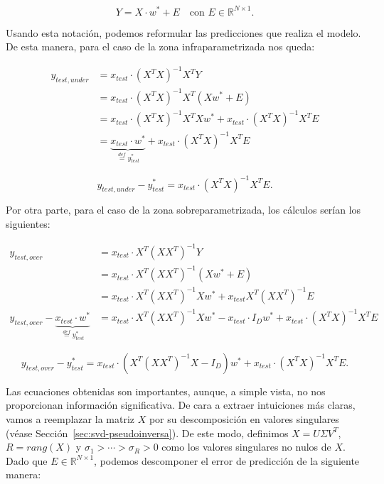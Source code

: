 \[
    Y = X \cdot w^{*} + E \quad \text{con } E \in \mathbb{R}^{N \times 1}.
\]\newline

Usando esta notación, podemos reformular las predicciones que realiza el modelo. De esta manera, para el caso de la zona infraparametrizada nos queda:

\begin{align}
    y_{test, under} &= x_{test} \cdot {(X^T X)}^{-1} X^T Y \\
    &= x_{test} \cdot {(X^T X)}^{-1} X^T (X w^{*} + E) \\
    &= x_{test} \cdot {(X^T X)}^{-1} X^T X w^{*} + x_{test} \cdot {(X^T X)}^{-1} X^T E \\
    &= \underbrace{x_{test} \cdot w^{*}}_{\overset{def}{=} y^*_{test}} + x_{test} \cdot {(X^T X)}^{-1} X^T E
\end{align}

\begin{equation}
    y_{test, under} - y^{*}_{test} = x_{test} \cdot {(X^T X)}^{-1} X^T E.
\end{equation}\newline

Por otra parte, para el caso de la zona sobreparametrizada, los cálculos serían los siguientes:

\begin{align}
    y_{test, over} &= x_{test} \cdot X^{T}{(XX^{T})}^{-1}Y \\
    &= x_{test} \cdot X^{T}{(XX^{T})}^{-1}(X w^{*} + E) \\
    &= x_{test} \cdot X^{T}{(XX^{T})}^{-1}X w^{*} + x_{test}X^{T}{(XX^{T})}^{-1}E \\
    y_{test, over} - \underbrace{x_{test} \cdot w^{*}}_{\overset{def}{=} y^*_{test}} &= x_{test} \cdot X^{T}{(XX^{T})}^{-1}X w^{*} - x_{test} \cdot I_{D} w^{*} + x_{test} \cdot {(X^{T}X)}^{-1}X^{T}E
\end{align}

\begin{equation}
    y_{test, over} - y^{*}_{test} = x_{test} \cdot (X^{T}{(XX^{T})}^{-1}X - I_{D}) w^{*} + x_{test} \cdot {(X^{T}X)}^{-1}X^{T}E.
\end{equation}\newline


Las ecuaciones obtenidas son importantes, aunque, a simple vista, no nos proporcionan información significativa. De cara a extraer intuiciones más claras, vamos a reemplazar la matriz $X$ por su descomposición en valores singulares (véase Sección~\ref{sec:svd-pseudoinversa}). De este modo, definimos $X = U \Sigma V^{T}$, $R = rang(X)$ y $\sigma_1 > \cdots > \sigma_R > 0$ como los valores singulares no nulos de $X$. Dado que $E \in \mathbb{R}^{N \times 1}$, podemos descomponer el error de predicción de la siguiente manera:

